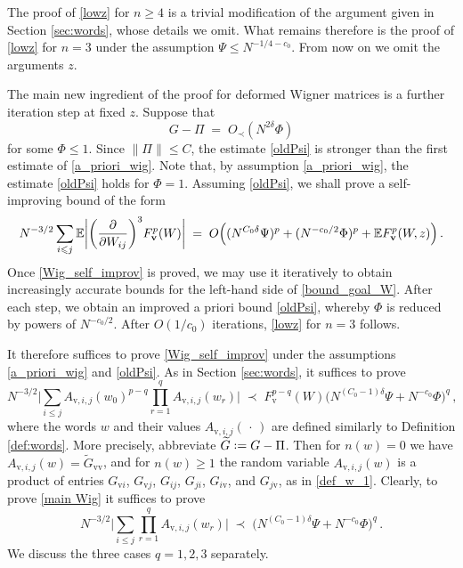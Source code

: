 \documentclass[11pt]{article} %
\numberwithin{equation}{section}
\numberwithin{figure}{section}
\theoremstyle{plain} %
\theoremstyle{definition} %
\newcommand{\f}[1]{\boldsymbol{\mathrm{#1}}} %
\newcommand{\wt}{\widetilde}
\newcommand{\E}{\mathbb{E}}
\newcommand*{\deq}{\mathrel{\vcenter{\baselineskip0.65ex \lineskiplimit0pt \hbox{.}\hbox{.}}}=}
\renewcommand{\leq}{\leqslant}
\renewcommand{\geq}{\geqslant}
\newcommand{\pb}[1]{\bigl({#1}\bigr)}
\newcommand{\pB}[1]{\Bigl({#1}\Bigr)}
\newcommand{\pbb}[1]{\biggl({#1}\biggr)}
\newcommand{\absbb}[1]{\biggl\lvert #1 \biggr\rvert}
\newcommand{\absBB}[1]{\Biggl\lvert #1 \Biggr\rvert}
\newcommand{\norm}[1]{\lVert #1 \rVert}
\begin{document}
The proof of \eqref{lowz} for $n \geq 4$ is a trivial modification of the argument given in Section \ref{sec:words}, whose details we omit. What remains therefore is the proof of \eqref{lowz} for $n = 3$ under the assumption $\Psi \leq N^{-1/4-c_0}$. From now on we omit the arguments $z$.

The main new ingredient of the proof for deformed Wigner matrices is a further iteration step at fixed $z$. Suppose that
\begin{equation} \label{oldPsi}
G - \Pi \;=\; O_\prec(N^{2 \delta} \Phi)
\end{equation}
for some $\Phi \leq 1$. Since $\norm{\Pi} \leq C$, the estimate \eqref{oldPsi} is stronger than the first estimate of \eqref{a_priori_wig}. Note that, by assumption \eqref{a_priori_wig}, the estimate \eqref{oldPsi} holds for $\Phi = 1$. Assuming \eqref{oldPsi}, we shall prove a self-improving bound of the form
\begin{equation} \label{Wig_self_improv}
N^{-3/2}   \sum_{i\leq j} \E \absbb{\pbb{\frac{\partial}{\partial W_{ij}}}^3 F^p_{\f v}(W)} \;=\; O \pB{(N^{C_0 \delta}\Psi)^p+(N^{-c_0/2} \Phi)^p+\E F_{\f v}^p(W,z)}\,.
\end{equation}
Once \eqref{Wig_self_improv} is proved, we may use it iteratively to obtain increasingly accurate bounds for the left-hand side of \eqref{bound_goal_W}. After each step, we obtain an improved a priori bound \eqref{oldPsi}, whereby $\Phi$ is reduced by powers of $N^{-c_0/2}$. After $O(1/c_0)$ iterations, \eqref{lowz} for $n = 3$ follows.

It therefore suffices to prove \eqref{Wig_self_improv} under the assumptions \eqref{a_priori_wig} and \eqref{oldPsi}. As in Section \ref{sec:words}, it suffices to prove
\begin{equation} \label{main Wig} 
N^{-3/2}\absBB{\sum_{i \leq j} A_{\f v,i, j}(w_0)^{p - q} \prod_{r = 1}^{q} A_{\f v,i,j }(w_r)} 
\;\prec\; F_{\f v}^{p-q}(W) \pb{N^{(C_0 -1) \delta} \Psi +N^{-c_0} \Phi}^q\,,
\end{equation}
where the words $w$ and their values $A_{\f v,i,j}(\,\cdot\,)$ are defined similarly to Definition \ref{def:words}. More precisely, abbreviate $\wt G \deq G - \Pi$. Then for $n(w) = 0$ we have $A_{\f v,i, j}(w) = \wt G_{\f v \f v}$, and for $n(w) \geq 1$ the random variable $A_{\f v,i,j }(w)$ is a product of entries $G_{\f v i}$, $G_{\f v j}$, $G_{i j}$, $G_{ji}$, $G_{i \f v}$, and $G_{j \f v}$, as in \eqref{def_w_1}. Clearly, to prove \eqref{main Wig} it suffices to prove
\begin{equation} \label{main Wig 2} 
N^{-3/2}\absBB{\sum_{i \leq j} \prod_{r = 1}^{q} A_{\f v,i,j }(w_r)} 
\;\prec\; \pb{N^{(C_0 -1) \delta} \Psi +N^{-c_0} \Phi}^q\,.
\end{equation}
We discuss the three cases $q = 1,2,3$ separately.
\end{document}
